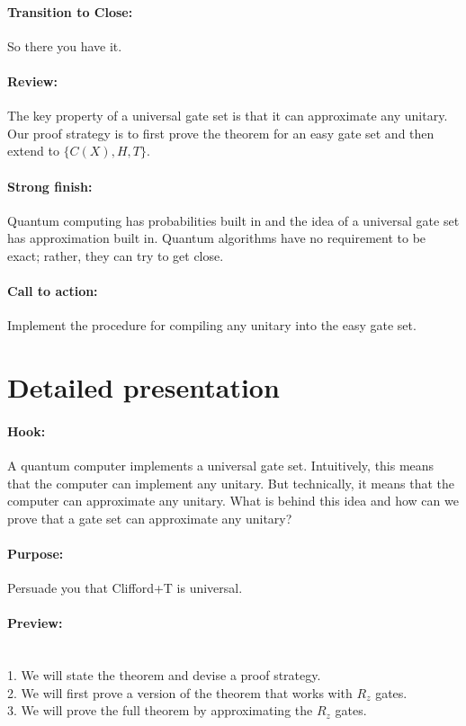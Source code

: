 \documentclass[11pt]{article}
\begin{document}
\paragraph{Transition to Close:} 
So there you have it.

\paragraph{Review:}
The key property of a universal gate set is that 
it can approximate any unitary.
Our proof strategy is to first prove the theorem for an easy gate set and then
extend to $\{C(X), H, T\}$.

\paragraph{Strong finish:}
Quantum computing has probabilities built in and
the idea of a universal gate set has approximation built in.
Quantum algorithms have no requirement to be exact; 
rather, they can try to get close.

\paragraph{Call to action:}
Implement the procedure for compiling any unitary into the easy gate set.

\newpage

\section*{Detailed presentation}

\paragraph{Hook:} 
A quantum computer implements a universal gate set.
Intuitively, this means that the computer can implement any unitary. 
But technically, it means that the computer can approximate any unitary.
What is behind this idea and how can we prove that 
a gate set can approximate any unitary?

\paragraph{Purpose:} Persuade you that Clifford+T is universal.

\paragraph{Preview:} \mbox{} \\
\hspace*{1cm}
1. We will state the theorem and devise a proof strategy.
\\
\hspace*{1cm}
2. We will first prove a version of the theorem that works with $R_z$ gates.
\\
\hspace*{1cm}
3. We will prove the full theorem by approximating the $R_z$ gates.
\end{document}
